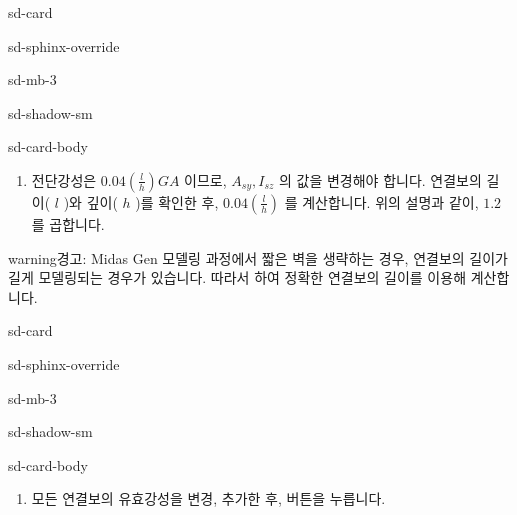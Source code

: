 \documentclass[a4paper,10pt,korean]{sphinxmanual}
\begin{document}
\begin{sphinxuseclass}{sd-card}
\begin{sphinxuseclass}{sd-sphinx-override}
\begin{sphinxuseclass}{sd-mb-3}
\begin{sphinxuseclass}{sd-shadow-sm}
\begin{sphinxuseclass}{sd-card-body}\begin{enumerate}
%
\setcounter{enumi}{2}
\item {} 
\sphinxAtStartPar
전단강성은 \(0.04(\frac{l}{h})GA\) 이므로, \(A_{sy}, I_{sz}\) 의 값을 변경해야 합니다.
연결보의 길이( \(l\) )와 깊이( \(h\) )를 확인한 후, \(0.04(\frac{l}{h})\) 를 계산합니다.
위의 설명과 같이, \(1.2\) 를 곱합니다.

\end{enumerate}

\begin{figure}[htbp]
\centering

\noindent{}
\end{figure}

\end{sphinxuseclass}
\end{sphinxuseclass}
\end{sphinxuseclass}
\end{sphinxuseclass}
\end{sphinxuseclass}
\begin{sphinxadmonition}{warning}{경고:}
\sphinxAtStartPar
Midas Gen 모델링 과정에서 짧은 벽을 생략하는 경우, 연결보의 길이가 길게 모델링되는 경우가 있습니다.
따라서  하여 정확한 연결보의 길이를 이용해 계산합니다.
\end{sphinxadmonition}

\begin{sphinxuseclass}{sd-card}
\begin{sphinxuseclass}{sd-sphinx-override}
\begin{sphinxuseclass}{sd-mb-3}
\begin{sphinxuseclass}{sd-shadow-sm}
\begin{sphinxuseclass}{sd-card-body}\begin{enumerate}
%
\setcounter{enumi}{3}
\item {} 
\sphinxAtStartPar
모든 연결보의 유효강성을 변경, 추가한 후,  버튼을 누릅니다.

\end{enumerate}

\end{sphinxuseclass}
\end{sphinxuseclass}
\end{sphinxuseclass}
\end{sphinxuseclass}
\end{sphinxuseclass}
\end{document}

